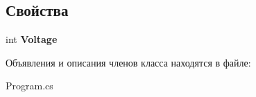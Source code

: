 \subsection*{Свойства}
\begin{DoxyCompactItemize}
\item 
int {\bfseries Voltage}\hspace{0.3cm}{\ttfamily  [get, set]}\label{class_player___power_1_1_power_a6f18f8e34d5b60ec23513b790899b0c3}

\end{DoxyCompactItemize}


Объявления и описания членов класса находятся в файле\-:\begin{DoxyCompactItemize}
\item 
Program.\-cs\end{DoxyCompactItemize}
